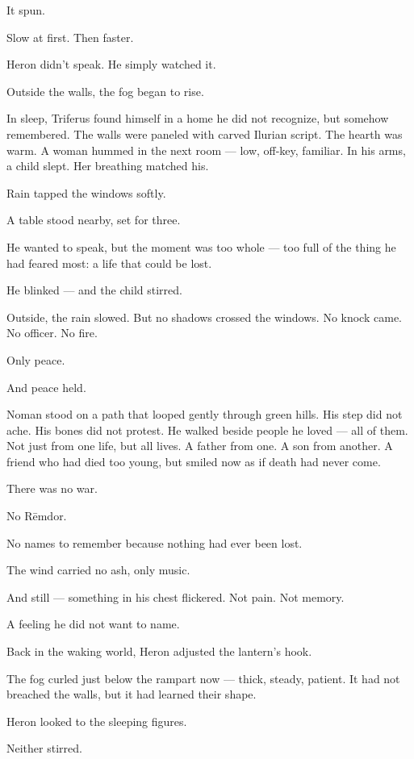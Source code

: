 \documentclass[12pt]{article}
\begin{document}
It spun.

Slow at first. Then faster.

Heron didn’t speak. He simply watched it.

Outside the walls, the fog began to rise.

\bigskip

In sleep, Triferus found himself in a home he did not recognize, but somehow remembered. The walls were paneled with carved Ilurian script. The hearth was warm. A woman hummed in the next room — low, off-key, familiar. In his arms, a child slept. Her breathing matched his.

Rain tapped the windows softly.

A table stood nearby, set for three.

He wanted to speak, but the moment was too whole — too full of the thing he had feared most: a life that could be lost.

He blinked — and the child stirred.

Outside, the rain slowed. But no shadows crossed the windows. No knock came. No officer. No fire.

Only peace.

And peace held.

\bigskip

Noman stood on a path that looped gently through green hills. His step did not ache. His bones did not protest. He walked beside people he loved — all of them. Not just from one life, but all lives. A father from one. A son from another. A friend who had died too young, but smiled now as if death had never come.

There was no war.

No Rēmdor.

No names to remember because nothing had ever been lost.

The wind carried no ash, only music.

And still — something in his chest flickered. Not pain. Not memory.

A feeling he did not want to name.

\bigskip

Back in the waking world, Heron adjusted the lantern’s hook.

The fog curled just below the rampart now — thick, steady, patient. It had not breached the walls, but it had learned their shape.

Heron looked to the sleeping figures.

Neither stirred.
\end{document}
